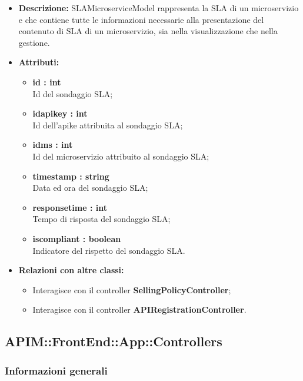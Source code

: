 \begin{itemize}
	\item \textbf{Descrizione:} SLAMicroserviceModel rappresenta la SLA di un microservizio e che
contiene tutte le informazioni necessarie alla presentazione del contenuto di SLA di un microservizio, sia nella visualizzazione che nella gestione.
	\item \textbf{Attributi:}
		\begin{itemize}
			\item \textbf{id : int}\\
			Id del sondaggio SLA;
			\item \textbf{idapikey : int}\\
			Id dell'apike attribuita al sondaggio SLA;
			\item \textbf{idms : int}\\
			Id del microservizio attribuito al sondaggio SLA;
			\item \textbf{timestamp : string}\\
			Data ed ora del sondaggio SLA;
			\item \textbf{responsetime : int}\\
			Tempo di risposta del sondaggio SLA;
			\item \textbf{iscompliant : boolean}\\
			Indicatore del rispetto del sondaggio SLA.
		\end{itemize}
	\item \textbf{Relazioni con altre classi:}
		\begin{itemize}
			\item Interagisce con il controller \textbf{SellingPolicyController};
			\item Interagisce con il controller \textbf{APIRegistrationController}.		
		\end{itemize}
\end{itemize}


\subsection{APIM::FrontEnd::App::Controllers}

\subsubsection{Informazioni generali}

